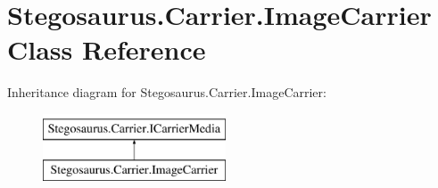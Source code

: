 \hypertarget{class_stegosaurus_1_1_carrier_1_1_image_carrier}{}\section{Stegosaurus.\+Carrier.\+Image\+Carrier Class Reference}
\label{class_stegosaurus_1_1_carrier_1_1_image_carrier}
Inheritance diagram for Stegosaurus.\+Carrier.\+Image\+Carrier\+:\begin{figure}[H]
\begin{center}
\leavevmode
\includegraphics[height=2.000000cm]{class_stegosaurus_1_1_carrier_1_1_image_carrier}
\end{center}
\end{figure}
